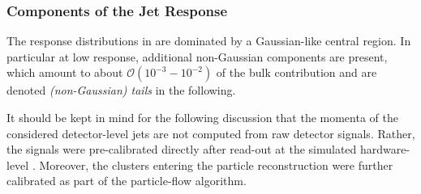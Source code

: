 \subsubsection{Components of the Jet Response} \label{sec:Jets:JEC:Response:Components}
The response distributions in  are dominated by a Gaussian-like central region.
In particular at low response, additional non-Gaussian components are present, which amount to about $\mathcal{O}(10^{-3}-10^{-2})$ of the bulk contribution and are denoted \textit{(non-Gaussian) tails} in the following.

It should be kept in mind for the following discussion that the momenta of the considered detector-level jets are not computed from raw detector signals.
Rather, the signals were pre-calibrated directly after read-out at the simulated hardware-level \addref.
Moreover, the clusters entering the particle reconstruction were further calibrated as part of the particle-flow algorithm.

